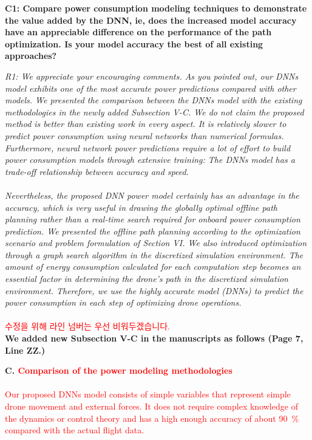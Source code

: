 \documentclass[onecolumn]{IEEEconf}
\begin{document}
\begin{description}
    \item \textbf
	{
	C1: Compare power consumption modeling techniques to demonstrate the value added by the DNN, ie, does the increased model accuracy have an appreciable difference on the performance of the path optimization. Is your model accuracy the best of all existing approaches? 
	}
	\item \textit
	{
	R1: We appreciate your encouraging comments. As you pointed out, our DNNs model exhibits one of the most accurate power predictions compared with other models. We presented the comparison between the DNNs model with the existing methodologies in the newly added Subsection V-C. We do not claim the proposed method is better than existing work in every aspect. It is relatively slower to predict power consumption using neural networks than numerical formulas. Furthermore, neural network power predictions require a lot of effort to build power consumption models through extensive training: The DNNs model has a trade-off relationship between accuracy and speed.~\\ 
    ~\\
    Nevertheless, the proposed DNN power model certainly has an advantage in the accuracy, which is very useful in drawing the globally optimal offline path planning rather than a real-time search required for onboard power consumption prediction. We presented the offline path planning according to the optimization scenario and problem formulation of Section VI. We also introduced optimization through a graph search algorithm in the discretized simulation environment. The amount of energy consumption calculated for each computation step becomes an essential factor in determining the drone's path in the discretized simulation environment. Therefore, we use the highly accurate model (DNNs) to predict the power consumption in each step of optimizing drone operations. 
	}
	~\\
    ~\\
    \textcolor{red}{수정을 위해 라인 넘버는 우선 비워두겠습니다.}\\
	\textbf{We added new Subsection V-C in the manuscripts as follows (Page 7, Line ZZ.)}\\
    \begin{mdframed}[ linewidth=.75pt, userdefinedwidth=0.9\textwidth]
    \textbf{C. \textcolor{red}{Comparison of the power modeling methodologies}}~\\
    ~\\
    \textcolor{red}{Our proposed DNNs model consists of simple variables that represent simple drone movement and external forces. It does not require complex knowledge of the dynamics or control theory and has a high enough accuracy of about 90~\% compared with the actual flight data.}

\end{mdframed}
\end{description}
\end{document}
